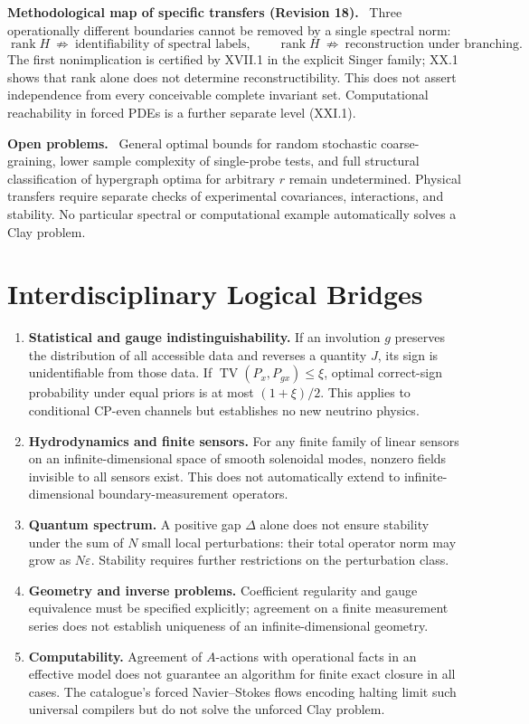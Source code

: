 \documentclass[11pt,a4paper,oneside]{book}
\DeclareMathOperator{\rank}{rank}\DeclareMathOperator{\Tr}{Tr}
\newcommand{\note}[1]{\par\medskip\noindent\textbf{#1}\ }
\begin{document}
\note{Methodological map of specific transfers (Revision 18).} Three operationally different boundaries cannot be removed by a single spectral norm:
\[\rank H\ \not\Rightarrow\ \text{identifiability of spectral labels},\qquad\rank H\ \not\Rightarrow\ \text{reconstruction under branching}.\]
The first nonimplication is certified by XVII.1 in the explicit Singer family; XX.1 shows that rank alone does not determine reconstructibility. This does not assert independence from every conceivable complete invariant set. Computational reachability in forced PDEs is a further separate level (XXI.1).
\note{Open problems.} General optimal bounds for random stochastic coarse-graining, lower sample complexity of single-probe tests, and full structural classification of hypergraph optima for arbitrary $r$ remain undetermined. Physical transfers require separate checks of experimental covariances, interactions, and stability. No particular spectral or computational example automatically solves a Clay problem.
\chapter{Interdisciplinary Logical Bridges}
\begin{enumerate}
\item \textbf{Statistical and gauge indistinguishability.} If an involution $g$ preserves the distribution of all accessible data and reverses a quantity $J$, its sign is unidentifiable from those data. If $\operatorname{TV}(P_x,P_{gx})\le\xi$, optimal correct-sign probability under equal priors is at most $(1+\xi)/2$. This applies to conditional CP-even channels but establishes no new neutrino physics.
\item \textbf{Hydrodynamics and finite sensors.} For any finite family of linear sensors on an infinite-dimensional space of smooth solenoidal modes, nonzero fields invisible to all sensors exist. This does not automatically extend to infinite-dimensional boundary-measurement operators.
\item \textbf{Quantum spectrum.} A positive gap $\Delta$ alone does not ensure stability under the sum of $N$ small local perturbations: their total operator norm may grow as $N\varepsilon$. Stability requires further restrictions on the perturbation class.
\item \textbf{Geometry and inverse problems.} Coefficient regularity and gauge equivalence must be specified explicitly; agreement on a finite measurement series does not establish uniqueness of an infinite-dimensional geometry.
\item \textbf{Computability.} Agreement of $A$-actions with operational facts in an effective model does not guarantee an algorithm for finite exact closure in all cases. The catalogue's forced Navier--Stokes flows encoding halting limit such universal compilers but do not solve the unforced Clay problem.
\end{enumerate}
\end{document}
